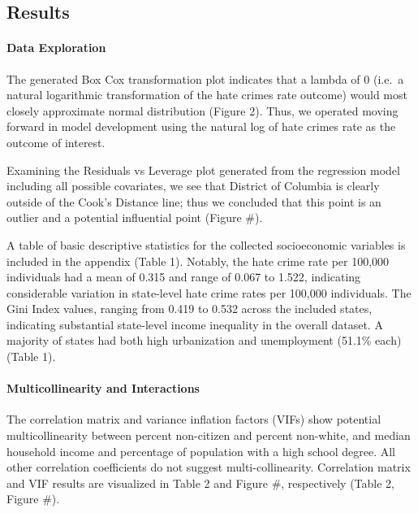 \documentclass[
]{article}
\begin{document}
\hypertarget{results}{%
\subsection{Results}\label{results}}

\hypertarget{data-exploration-1}{%
\paragraph{Data Exploration}\label{data-exploration-1}}

The generated Box Cox transformation plot indicates that a lambda of 0
(i.e.~a natural logarithmic transformation of the hate crimes rate
outcome) would most closely approximate normal distribution (Figure 2).
Thus, we operated moving forward in model development using the natural
log of hate crimes rate as the outcome of interest.

Examining the Residuals vs Leverage plot generated from the regression
model including all possible covariates, we see that District of
Columbia is clearly outside of the Cook's Distance line; thus we
concluded that this point is an outlier and a potential influential
point (Figure \#).

A table of basic descriptive statistics for the collected socioeconomic
variables is included in the appendix (Table 1). Notably, the hate crime
rate per 100,000 individuals had a mean of 0.315 and range of 0.067 to
1.522, indicating considerable variation in state-level hate crime rates
per 100,000 individuals. The Gini Index values, ranging from 0.419 to
0.532 across the included states, indicating substantial state-level
income inequality in the overall dataset. A majority of states had both
high urbanization and unemployment (51.1\% each) (Table 1).

\hypertarget{multicollinearity-and-interactions-1}{%
\paragraph{Multicollinearity and
Interactions}\label{multicollinearity-and-interactions-1}}

The correlation matrix and variance inflation factors (VIFs) show
potential multicollinearity between percent non-citizen and percent
non-white, and median household income and percentage of population with
a high school degree. All other correlation coefficients do not suggest
multi-collinearity. Correlation matrix and VIF results are visualized in
Table 2 and Figure \#, respectively (Table 2, Figure \#).
\end{document}

